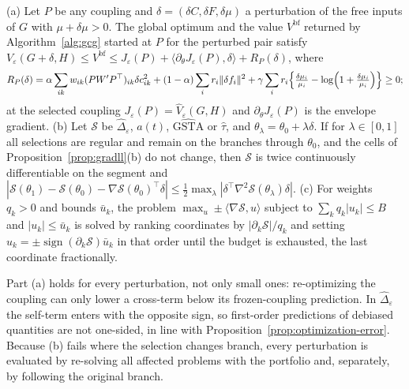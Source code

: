 \begin{proposition}\label{prop:local}
(a) Let $P$ be any coupling and $\delta=(\delta C,\delta F,\delta\mu)$ a perturbation of the free inputs of $G$ with $\mu+\delta\mu>0$. The global optimum and the value $V^{\mathrm{bf}}$ returned by Algorithm~\ref{alg:gcg} started at $P$ for the perturbed pair satisfy
$V_\varepsilon(G+\delta,H)\le V^{\mathrm{bf}}\le J_\varepsilon(P)+\langle\partial_\theta J_\varepsilon(P),\delta\rangle+R_P(\delta)$, where
\[
R_P(\delta)=\alpha\sum_{ik}w_{ik}(PW'P^\top)_{ik}\delta c_{ik}^2+(1-\alpha)\sum_ir_i\|\delta f_i\|^2+\gamma\sum_ir_i\Bigl\{\tfrac{\delta\mu_i}{\mu_i}-\log\Bigl(1+\tfrac{\delta\mu_i}{\mu_i}\Bigr)\Bigr\}\ge0;
\]
at the selected coupling $J_\varepsilon(P)=\widehat V_\varepsilon(G,H)$ and $\partial_\theta J_\varepsilon(P)$ is the envelope gradient.
(b) Let $\mathcal S$ be $\widehat\Delta_\varepsilon$, $a(t)$, $\widehat{\mathrm{GSTA}}$ or $\hat\tau$, and $\theta_\lambda=\theta_0+\lambda\delta$. If for $\lambda\in[0,1]$ all selections are regular and remain on the branches through $\theta_0$, and the cells of Proposition~\ref{prop:gradll}(b) do not change, then $\mathcal S$ is twice continuously differentiable on the segment and
$|\mathcal S(\theta_1)-\mathcal S(\theta_0)-\nabla\mathcal S(\theta_0)^\top\delta|\le\tfrac12\max_\lambda|\delta^\top\nabla^2\mathcal S(\theta_\lambda)\delta|$.
(c) For weights $q_k>0$ and bounds $\bar u_k$, the problem $\max_u\pm\langle\nabla\mathcal S,u\rangle$ subject to $\sum_kq_k|u_k|\le B$ and $|u_k|\le\bar u_k$ is solved by ranking coordinates by $|\partial_k\mathcal S|/q_k$ and setting $u_k=\pm\operatorname{sign}(\partial_k\mathcal S)\bar u_k$ in that order until the budget is exhausted, the last coordinate fractionally.
\end{proposition}

Part (a) holds for every perturbation, not only small ones: re-optimizing the coupling can only lower a cross-term below its frozen-coupling prediction. In $\widehat\Delta_\varepsilon$ the self-term enters with the opposite sign, so first-order predictions of debiased quantities are not one-sided, in line with Proposition~\ref{prop:optimization-error}. Because (b) fails where the selection changes branch, every perturbation is evaluated by re-solving all affected problems with the portfolio and, separately, by following the original branch.

